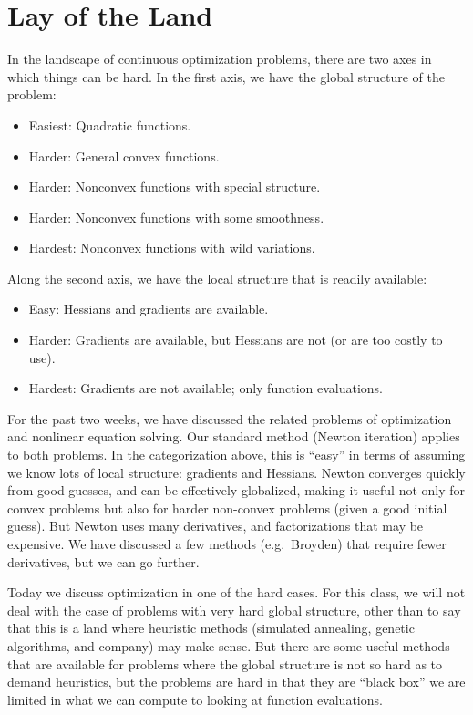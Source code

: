 \documentclass[12pt, leqno]{article} %
\begin{document}

\section*{Lay of the Land}

In the landscape of continuous optimization problems, there are
two axes in which things can be hard.  In the first axis,
we have the global structure of the problem:
\begin{itemize}
\item
  Easiest: Quadratic functions.
\item
  Harder: General convex functions.
\item
  Harder: Nonconvex functions with special structure.
\item
  Harder: Nonconvex functions with some smoothness.
\item
  Hardest: Nonconvex functions with wild variations.
\end{itemize}
Along the second axis, we have the local structure that is
readily available:
\begin{itemize}
\item
  Easy: Hessians and gradients are available.
\item
  Harder: Gradients are available, but Hessians are not (or are too
  costly to use).
\item
  Hardest: Gradients are not available; only function evaluations.
\end{itemize}

For the past two weeks, we have discussed the related problems of
optimization and nonlinear equation solving.  Our standard method
(Newton iteration) applies to both problems.  In the categorization
above, this is ``easy'' in terms of assuming we know lots of local
structure: gradients and Hessians.  Newton converges quickly
from good guesses, and can be effectively globalized, making it
useful not only for convex problems but also for harder non-convex
problems (given a good initial guess).  But Newton uses
many derivatives, and factorizations that may be expensive.  We
have discussed a few methods (e.g.~Broyden) that require fewer
derivatives, but we can go further.

Today we discuss optimization in one of the hard cases.  For this
class, we will not deal with the case of problems with very hard
global structure, other than to say that this is a land where
heuristic methods (simulated annealing, genetic algorithms, and
company) may make sense.  But there are some useful methods that are
available for problems where the global structure is not so hard as to
demand heuristics, but the problems are hard in that they are ``black
box'' we are limited in what we can compute to looking at function
evaluations.
\end{document}
